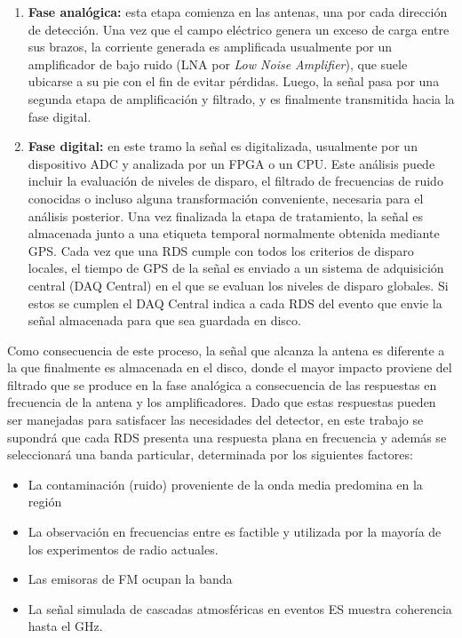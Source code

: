 	\begin{enumerate}
		\item \textbf{Fase anal\'ogica:} esta etapa comienza en las antenas, una por cada direcci\'on de detecci\'on. Una vez que el campo el\'ectrico genera un exceso de carga entre sus brazos, la corriente generada es amplificada usualmente por un amplificador de bajo ruido (LNA por \emph{Low Noise Amplifier}), que suele ubicarse a su pie con el fin de evitar p\'erdidas. Luego, la se\~nal pasa por una segunda etapa de amplificaci\'on y filtrado, y es finalmente transmitida hacia la fase digital.
		\item \textbf{Fase digital:} en este tramo la se\~nal es digitalizada, usualmente por un dispositivo ADC y analizada por un FPGA o un CPU. Este an\'alisis puede incluir la evaluaci\'on de niveles de disparo, el filtrado de frecuencias de ruido conocidas o incluso alguna transformaci\'on conveniente, necesaria para el an\'alisis posterior. Una vez finalizada la etapa de tratamiento, la se\~nal es almacenada junto a una etiqueta temporal normalmente obtenida mediante GPS. 
		Cada vez que una RDS cumple con todos los criterios de disparo locales, el tiempo de GPS de la se\~nal es enviado a un sistema de adquisici\'on central (DAQ Central) en el que se evaluan los niveles de disparo globales.
		Si estos se cumplen el DAQ Central indica a cada RDS del evento que envie la se\~nal almacenada para que sea guardada en disco.
	\end{enumerate}
	
	Como consecuencia de este proceso, la se\~nal que alcanza la antena es diferente a la que finalmente es almacenada en el disco, donde el mayor impacto proviene del filtrado que se produce en la fase anal\'ogica a consecuencia de las respuestas en frecuencia de la antena y los amplificadores.
	Dado que estas respuestas pueden ser manejadas para satisfacer las necesidades del detector, en este trabajo se supondr\'a que cada RDS presenta una respuesta plana en frecuencia y adem\'as se seleccionar\'a una banda particular, determinada por los siguientes factores:
	\begin{itemize}
	 \item La contaminaci\'on (ruido) proveniente de la onda media predomina en la regi\'on 
	 \item La observaci\'on en frecuencias entre  es factible y utilizada por la mayor\'ia de los experimentos de radio actuales.
	 \item Las emisoras de FM ocupan la banda 
	 \item La se\~nal simulada de cascadas atmosf\'ericas en eventos ES muestra coherencia hasta el GHz.
	\end{itemize}
	
